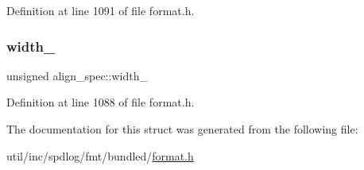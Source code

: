 Definition at line 1091 of file format.\+h.

\mbox{\label{structalign__spec_a27454583473a3ceab8c12b0060748ae8}} 
\subsubsection{\texorpdfstring{width\+\_\+}{width\_}}
{\footnotesize\ttfamily unsigned align\+\_\+spec\+::width\+\_\+}



Definition at line 1088 of file format.\+h.



The documentation for this struct was generated from the following file\+:\begin{DoxyCompactItemize}
\item 
util/inc/spdlog/fmt/bundled/\hyperlink{format_8h}{format.\+h}\end{DoxyCompactItemize}
